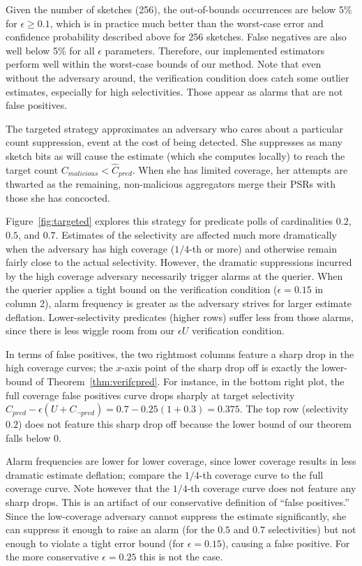 \documentclass[10pt,twocolumn]{article}
\newcommand{\cpred}{\ensuremath{C_\mathit{pred}}\xspace}
\newcommand{\cnpred}{\ensuremath{C_{\neg\mathit{pred}}}\xspace}
\newcommand{\estcpred}{\ensuremath{\hat{C}_\mathit{pred}}\xspace}
\newcommand{\cmalicious}{\ensuremath{{C}_\mathit{malicious}}\xspace}
\newcommand\vpar{{\vspace*{0.3em}}}
\newcommand{\stitle}[1]{\vpar\noindent{\bf #1\/}}
\begin{document}
Given the number of sketches (256), the out-of-bounds occurrences are
below 5\% for $\epsilon \geq 0.1$, which is in practice much better
than the worst-case error and confidence probability described above for 256
sketches.  False negatives  are also well below 5\% for all
$\epsilon$ parameters.  Therefore, our
implemented estimators perform well within the worst-case bounds of our
method.  Note that even without the adversary
around, the verification condition does catch some outlier estimates,
especially for high selectivities.  Those appear as alarms that
are not false positives.


\stitle{Targeted Strategy.}
The targeted strategy approximates an adversary who cares about a
particular count suppression, event at the cost of being detected.  She
suppresses as many sketch bits as will cause the estimate (which she
computes locally) to reach the target
count $\cmalicious < \estcpred$. 
When she has limited coverage, her attempts are thwarted as the
remaining, non-malicious aggregators merge their PSRs with those she has
concocted.

Figure~\ref{fig:targeted} explores this strategy for predicate polls of
cardinalities $0.2$, $0.5$, and $0.7$.   Estimates of the selectivity
are affected much more dramatically when the adversary has high coverage
($1/4$-th or more) and otherwise remain fairly close to the actual
selectivity.  However, the dramatic suppressions incurred by the high
coverage adversary necessarily trigger alarms at the querier.  When the
querier applies a tight bound on the verification condition ($\epsilon =
0.15$ in column 2), alarm frequency is greater as the adversary
strives for larger estimate deflation.  Lower-selectivity predicates
(higher rows) suffer less from those alarms, since there is less wiggle
room from our $\epsilon U$ verification condition.

In terms of false positives, the two rightmost columns feature a sharp
drop in the high coverage curves; the $x$-axis point of the sharp drop
off is exactly the lower-bound of Theorem~\ref{thm:verifcpred}.  For
instance, in the bottom right plot, the full coverage false positives
curve drops sharply at target selectivity $\cpred -
\epsilon(U + \cnpred) = 0.7 - 0.25(1 + 0.3) = 0.375$. The top row
(selectivity $0.2$) does not feature this sharp drop off
because the lower bound of our theorem falls below $0$.

Alarm
frequencies are lower for lower coverage, since lower coverage results
in less dramatic estimate deflation; compare the $1/4$-th coverage
curve to the full coverage curve.  Note however that the
$1/4$-th coverage curve does not feature any sharp drops. This is an
artifact of our conservative definition of ``false positives.''  Since
the low-coverage adversary cannot suppress the estimate
significantly, she can suppress it enough to raise an alarm (for the
$0.5$ and $0.7$ selectivities) but not enough to violate a tight error
bound (for $\epsilon=0.15$), causing a false positive.
For the more conservative $\epsilon=0.25$ this is
not the case.
\end{document}
